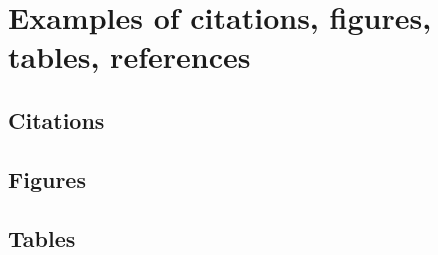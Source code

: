\documentclass{article}
\begin{document}
\section{Examples of citations, figures, tables, references}

\subsection{Citations}


\subsection{Figures}


\subsection{Tables}



\end{document}
